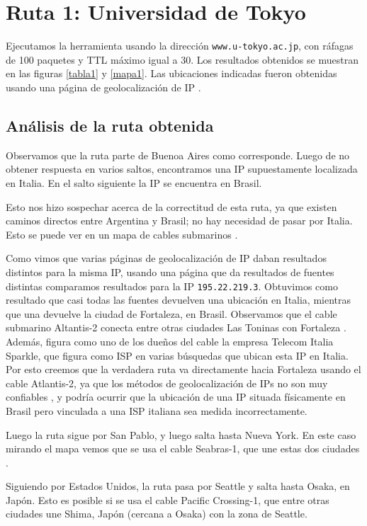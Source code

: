 \section{Ruta 1: Universidad de Tokyo}

Ejecutamos la herramienta usando la dirección \texttt{www.u-tokyo.ac.jp}, con ráfagas de 100 paquetes y TTL máximo igual a 30. Los resultados obtenidos se muestran en las figuras \ref{tabla1} y \ref{mapa1}. Las ubicaciones indicadas fueron obtenidas usando una página de geolocalización de IP \cite{ip2location}.

\subsection{Análisis de la ruta obtenida}
Observamos que la ruta parte de Buenoa Aires como corresponde. Luego de no obtener respuesta en varios saltos, encontramos una IP supuestamente localizada en Italia. En el salto siguiente la IP se encuentra en Brasil.

Esto nos hizo sospechar acerca de la correctitud de esta ruta, ya que existen caminos directos entre Argentina y Brasil; no hay necesidad de pasar por Italia. Esto se puede ver en un mapa de cables submarinos \cite{cables}.

Como vimos que varias páginas de geolocalización de IP daban resultados distintos para la misma IP, usando una página que da resultados de fuentes distintas \cite{iplocation} comparamos resultados para la IP \texttt{195.22.219.3}. Obtuvimos como resultado que casi todas las fuentes devuelven una ubicación en Italia, mientras que una devuelve la ciudad de Fortaleza, en Brasil. Observamos que el cable submarino Altantis-2 conecta entre otras ciudades Las Toninas con Fortaleza \cite{atlantis2}. Además, figura como uno de los dueños del cable la empresa Telecom Italia Sparkle, que figura como ISP en varias búsquedas que ubican esta IP en Italia. Por esto creemos que la verdadera ruta va directamente hacia Fortaleza usando el cable Atlantis-2, ya que los métodos de geolocalización de IPs no son muy confiables \cite{accuracy}, y podría ocurrir que la ubicación de una IP situada físicamente en Brasil pero vinculada a una ISP italiana sea medida incorrectamente.

Luego la ruta sigue por San Pablo, y luego salta hasta Nueva York. En este caso mirando el mapa \cite{cables} vemos que se usa el cable Seabras-1, que une estas dos ciudades \cite{seabras1}.

Siguiendo por Estados Unidos, la ruta pasa por Seattle y salta hasta Osaka, en Japón. Esto es posible si se usa el cable Pacific Crossing-1, que entre otras ciudades une Shima, Japón (cercana a Osaka) con la zona de Seattle.

